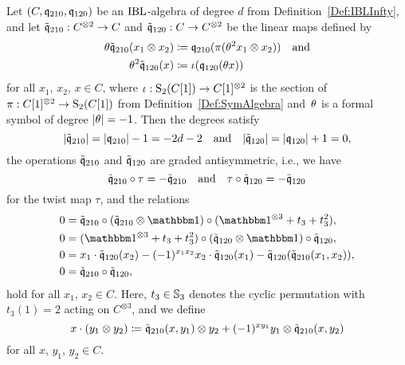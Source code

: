 \documentclass[\MainFolder/Text.tex]{subfiles}
\begin{document}
\begin{Proposition}\label{Prop:ClasModIBL}
Let $(C,\mathfrak{q}_{210}, \mathfrak{q}_{120})$ be an $\mathrm{IBL}$-algebra of degree $d$ from Definition~\ref{Def:IBLInfty}, and let $\tilde{\mathfrak{q}}_{210} : C^{\otimes 2} \rightarrow C$ and $\tilde{\mathfrak{q}}_{120}: C \rightarrow C^{\otimes 2}$ be the linear maps defined by
\begin{equation}\label{Eq:ClasModIBL}
\begin{aligned}
\theta \tilde{\mathfrak{q}}_{210}(x_1 \otimes x_2) &\coloneqq \mathfrak{q}_{210}(\pi(\theta^2 x_1 \otimes x_2)) \quad\text{and} \\
\theta^2 \tilde{\mathfrak{q}}_{120}(x) &\coloneqq \iota(\mathfrak{q}_{120}(\theta x))
\end{aligned}
\end{equation}
for all $x_1$, $x_2$, $x\in C$, where $\iota: \mathrm{S}_2(C[1]) \rightarrow C[1]^{\otimes 2}$ is the section of $\pi: C[1]^{\otimes 2} \rightarrow \mathrm{S}_2(C[1])$ from Definition~\ref{Def:SymAlgebra} and~$\theta$ is a formal symbol of degree $|\theta| = -1$. Then the degrees satisfy
\[ |\tilde{\mathfrak{q}}_{210}| = |\mathfrak{q}_{210}| - 1 = -2d - 2\quad\text{and}\quad|\tilde{\mathfrak{q}}_{120}| = |\mathfrak{q}_{120}| + 1 = 0, \]
the operations $\tilde{\mathfrak{q}}_{210}$ and $\tilde{\mathfrak{q}}_{120}$ are graded antisymmetric, i.e., we have
\[ \tilde{\mathfrak{q}}_{210} \circ\tau = - \tilde{\mathfrak{q}}_{210}\quad\text{and}\quad\tau \circ \tilde{\mathfrak{q}}_{120} = - \tilde{\mathfrak{q}}_{120} \]
for the twist map $\tau$, and the relations
\begin{align*}
0&=\tilde{\OPQ}_{210}\circ (\tilde{\OPQ}_{210}\otimes \Id)\circ (\Id^{\otimes 3}+ t_3 + t_3^2), \\
0&=(\Id^{\otimes 3}+t_3 + t_3^2)\circ (\tilde{\OPQ}_{120}\otimes\Id)\circ \tilde{\OPQ}_{120}, \\
0&= x_1 \cdot \tilde{\OPQ}_{120}(x_2) - (-1)^{ x_1 x_2} x_2 \cdot \tilde{\OPQ}_{120}(x_1) - \tilde{\OPQ}_{120}(\tilde{\OPQ}_{210}(x_1,x_2)), \\
0& = \tilde{\OPQ}_{210} \circ \tilde{\OPQ}_{120},
\end{align*}
hold for all $x_1$, $x_2\in C$. Here, $t_3 \in \mathbb{S}_3$ denotes the cyclic permutation with $t_3(1) = 2$ acting on $C^{\otimes 3}$, and we define
\[ x\cdot (y_1 \otimes y_2) \coloneqq \tilde{\mathfrak{q}}_{210}(x,y_1)\otimes y_2 + (-1)^{ x y_1} y_1 \otimes \tilde{\mathfrak{q}}_{210}(x,y_2) \]
for all $x$, $y_1$, $y_2 \in C$.
\end{Proposition}
\end{document}

